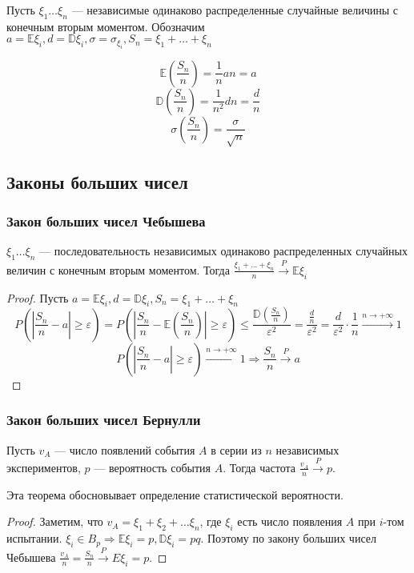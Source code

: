 Пусть \(\xi_1 \dots \xi_n\) --- независимые одинаково распределенные случайные величины с конечным вторым моментом. Обозначим \(a = \mathbb{E}\xi_i, d = \mathbb{D}\xi_i, \sigma = \sigma_{\xi_i}, S_n = \xi_1 + \dots + \xi_n\)

\[\mathbb{E}\left( \frac{S_n}{n} \right) = \frac{1}{n} an = a\]
\[\mathbb{D}\left( \frac{S_n}{n} \right) = \frac{1}{n^2} dn = \frac{d}{n}\]
\[\sigma\left( \frac{S_n}{n} \right) = \frac{\sigma}{\sqrt{n}}\]

\subsection{Законы больших чисел}

\subsubsection{Закон больших чисел Чебышева}

\begin{theorem}
    \(\xi_1 \dots \xi_n\) --- последовательность независимых одинаково распределенных случайных величин с конечным вторым моментом. Тогда \(\frac{\xi_1 + \dots + \xi_n}{n} \xrightarrow{P} \mathbb{E}\xi_i\)
\end{theorem}
\begin{proof}
    Пусть \(a = \mathbb{E}\xi_i, d = \mathbb{D}\xi_i, S_n = \xi_1 + \dots + \xi_n\)
    \[P\left( \left|\frac{S_n}{n} - a\right| \geq \varepsilon \right) = P\left( \left|\frac{S_n}{n} - \mathbb{E}\left( \frac{S_n}{n} \right) \right| \geq \varepsilon \right) \leq \frac{\mathbb{D}\left( \frac{S_n}{n} \right)}{\varepsilon^2} = \frac{\frac{d}{n}}{\varepsilon^2} = \frac{d}{\varepsilon^2} \cdot \frac{1}{n} \xrightarrow{n \to +\infty} 1\]
    \[P\left( \left|\frac{S_n}{n} - a\right| \geq \varepsilon \right) \xrightarrow{n \to +\infty} 1 \Rightarrow \frac{S_n}{n} \xrightarrow{P} a\]
\end{proof}

\subsubsection{Закон больших чисел Бернулли}

\begin{theorem}
    Пусть \(v_A\) --- число появлений события \(A\) в серии из \(n\) независимых экспериментов, \(p\) --- вероятность события \(A\). Тогда частота \(\frac{v_A}{n} \xrightarrow{P} p\).
\end{theorem}
\begin{remark}
    Эта теорема обосновывает определение статистической вероятности.
\end{remark}
\begin{proof}
    Заметим, что \(v_A = \xi_1 + \xi_2 + \dots \xi_n\), где \(\xi_i\) есть число появления \(A\) при \(i\)-том испытании. \(\xi_i \in B_p \Rightarrow \mathbb{E}\xi_i = p, \mathbb{D}\xi_i = pq\). Поэтому по закону больших чисел Чебышева \(\frac{v_A}{n} = \frac{S_n}{n} \xrightarrow{P} E \xi_i = p\).
\end{proof}

